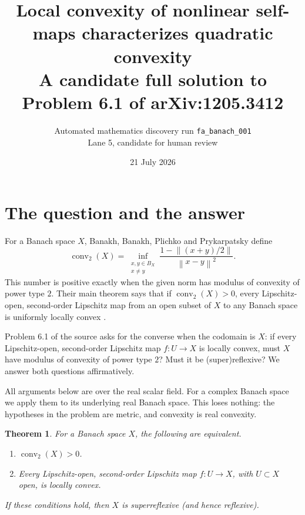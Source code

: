 \documentclass[11pt]{article}
\title{Local convexity of nonlinear self-maps characterizes quadratic convexity\\
\large A candidate full solution to Problem 6.1 of arXiv:1205.3412}
\author{Automated mathematics discovery run \texttt{fa\_banach\_001}\\
Lane 5, candidate for human review}
\date{21 July 2026}
\newtheorem{theorem}{Theorem}
\newcommand{\norm}[1]{\left\lVert #1\right\rVert}
\newcommand{\BX}{B_X}
\begin{document}
\maketitle

\begin{center}
\end{center}

\section{The question and the answer}

For a Banach space $X$, Banakh, Banakh, Plichko and Prykarpatsky define
\[
 \operatorname{conv}_2(X)
 =\inf_{\substack{x,y\in \BX\\x\ne y}}
   \frac{1-\norm{(x+y)/2}}{\norm{x-y}^2}.
\]
This number is positive exactly when the given norm has modulus of
convexity of power type $2$.  Their main theorem says that if
$\operatorname{conv}_2(X)>0$, every Lipschitz-open, second-order Lipschitz
map from an open subset of $X$ to any Banach space is uniformly locally
convex \cite{BBPP}.

Problem 6.1 of the source asks for the converse when the codomain is $X$:
if every Lipschitz-open, second-order Lipschitz map $f:U\to X$ is locally
convex, must $X$ have modulus of convexity of power type $2$?  Must it be
(super)reflexive?  We answer both questions affirmatively.

All arguments below are over the real scalar field.  For a complex Banach
space we apply them to its underlying real Banach space.  This loses
nothing: the hypotheses in the problem are metric, and convexity is real
convexity.

\begin{theorem}\label{thm:main}
For a Banach space $X$, the following are equivalent.
\begin{enumerate}
\item $\operatorname{conv}_2(X)>0$.
\item Every Lipschitz-open, second-order Lipschitz map $f:U\to X$, with
      $U\subset X$ open, is locally convex.
\end{enumerate}
If these conditions hold, then $X$ is superreflexive (and hence reflexive).
\end{theorem}
\end{document}
